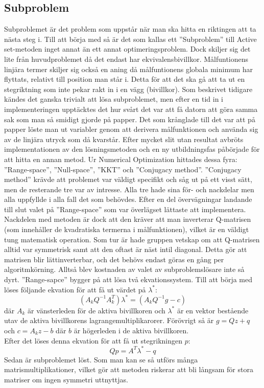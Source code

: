 \subsection{Subproblem}
Subproblemet är det problem som uppstår när man ska hitta en riktingen att ta nästa steg i. Till att börja med så är det som kallas ett ''Subproblem'' till Active set-metoden inget annat än ett annat optimeringsproblem. Dock skiljer sig det lite från huvudproblemet då det endast har ekvivalensbivillkor. Målfuntionens linjära termer skiljer sig också en aning då målfuntionens globala minimum har flyttats, relativt till position man står i. Detta för att det ska gå att ta ut en stegriktning som inte pekar rakt in i en vägg (bivillkor).
Som beskrivet tidigare kändes det ganska trivialt att lösa subproblemet, men efter en tid in i implementeringen upptäcktes det hur svårt det var att få datorn att göra samma sak som man så smidigt gjorde på papper. Det som krånglade till det var att på papper löste man ut variabler genom att derivera målfunktionen och använda sig av de linjära utryck som då kvarstår. Efter mycket slit utan resultat avbröts implementationen av den lösningsmetoden och en ny utbildningsfas påbörjade för att hitta en annan metod. Ur Numerical Optimization hittades dessa fyra: ''Range-space'', ''Null-space'', ''KKT'' och ''Conjugacy method''. ''Conjugacy method'' krävde att problemet var väldigt specifikt och såg ut på ett visst sätt, men de resterande tre var av intresse. Alla tre hade sina för- och nackdelar men alla uppfyllde i alla fall det som behövdes. Efter en del övervägningar landande till slut valet på ''Range-space'' som var överlägset lättaste att implementera. Nackdelen med metoden är dock att den kräver att man inverterar Q-matrisen (som innehåller de kvadratiska termerna i målfunktionen), vilket är en väldigt tung matematisk operation. Som tur är hade gruppen vetskap om att Q-matrisen alltid var symmetrisk samt att den oftast är näst intil diagonal. Detta gör att matrisen blir lättinverterbar, och det behövs endast göras en gång per algoritmkörning. Alltså blev kostnaden av valet av subproblemslösare inte så dyrt. ''Range-sapce'' bygger på att lösa två ekvationssystem. Till att börja med löses följande ekvation för att få ut värdet på $\lambda^*$:
$$({A_k}Q^{-1}A_k^T)\lambda^* = ({A_k}Q^{-1}g-c)$$
där $A_k$ är vänsterleden för de aktiva bivillkoren och $\lambda^*$ är en vektor bestående utav de aktiva bivillkorens lagrangemultiplikarorer. Förövrigt så är
$g = Qz+q$ och $c = A_kz - b$ där $b$ är högerleden i de aktiva bivillkoren. \\ Efter det löses denna ekvation för att få ut stegrikningen $p$:
$$Qp = A^T\lambda^* - q$$
Sedan är subproblemet löst. Som man kan se så utförs många matrismultiplikationer, vilket gör att metoden riskerar att bli långsam för stora matriser om ingen symmetri uttnyttjas. 


